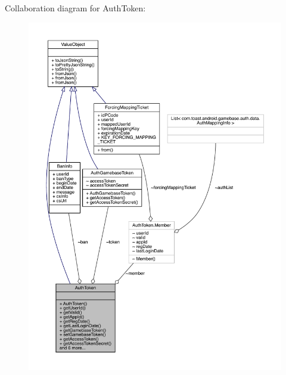 Collaboration diagram for Auth\+Token\+:
\nopagebreak
\begin{figure}[H]
\begin{center}
\leavevmode
\includegraphics[width=350pt]{classcom_1_1toast_1_1android_1_1gamebase_1_1auth_1_1data_1_1_auth_token__coll__graph}
\end{center}
\end{figure}
